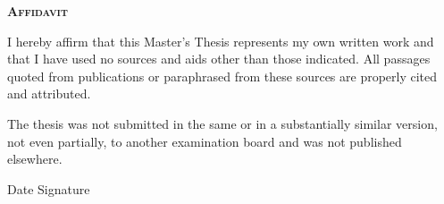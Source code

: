 %
%
%
% 
% 

{\Large\textbf{\textsc{Affidavit}}}

I hereby affirm that this Master’s Thesis represents my own written work and that I have used no sources and aids other than those indicated. All passages quoted from publications or paraphrased from these sources are properly cited and attributed.

The thesis was not submitted in the same or in a substantially similar version, not even partially, to another examination board and was not published elsewhere.

\vspace{2.0cm}
\noindent\makebox[\linewidth]{\rule{7cm}{0.4pt}  \hspace{1.0cm} {\rule{7cm}{0.4pt}}}

\hspace{3.0cm} Date \hspace{7.0cm} Signature\\
